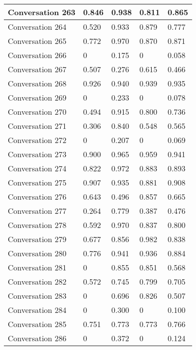 \begin{table}[]
\begin{tabular}{|l|l|l|l|l|}
Conversation 263 & 0.846    & 0.938 & 0.811       & 0.865   \\ \hline
Conversation 264 & 0.520    & 0.933 & 0.879       & 0.777   \\ \hline
Conversation 265 & 0.772    & 0.970 & 0.870       & 0.871   \\ \hline
Conversation 266 & 0        & 0.175 & 0           & 0.058   \\ \hline
Conversation 267 & 0.507    & 0.276 & 0.615       & 0.466   \\ \hline
Conversation 268 & 0.926    & 0.940 & 0.939       & 0.935   \\ \hline
Conversation 269 & 0        & 0.233 & 0           & 0.078   \\ \hline
Conversation 270 & 0.494    & 0.915 & 0.800       & 0.736   \\ \hline
Conversation 271 & 0.306    & 0.840 & 0.548       & 0.565   \\ \hline
Conversation 272 & 0        & 0.207 & 0           & 0.069   \\ \hline
Conversation 273 & 0.900    & 0.965 & 0.959       & 0.941   \\ \hline
Conversation 274 & 0.822    & 0.972 & 0.883       & 0.893   \\ \hline
Conversation 275 & 0.907    & 0.935 & 0.881       & 0.908   \\ \hline
Conversation 276 & 0.643    & 0.496 & 0.857       & 0.665   \\ \hline
Conversation 277 & 0.264    & 0.779 & 0.387       & 0.476   \\ \hline
Conversation 278 & 0.592    & 0.970 & 0.837       & 0.800   \\ \hline
Conversation 279 & 0.677    & 0.856 & 0.982       & 0.838   \\ \hline
Conversation 280 & 0.776    & 0.941 & 0.936       & 0.884   \\ \hline
Conversation 281 & 0        & 0.855 & 0.851       & 0.568   \\ \hline
Conversation 282 & 0.572    & 0.745 & 0.799       & 0.705   \\ \hline
Conversation 283 & 0        & 0.696 & 0.826       & 0.507   \\ \hline
Conversation 284 & 0        & 0.300 & 0           & 0.100   \\ \hline
Conversation 285 & 0.751    & 0.773 & 0.773       & 0.766   \\ \hline
Conversation 286 & 0        & 0.372 & 0           & 0.124   \\ \hline

\end{tabular}
\end{table}
